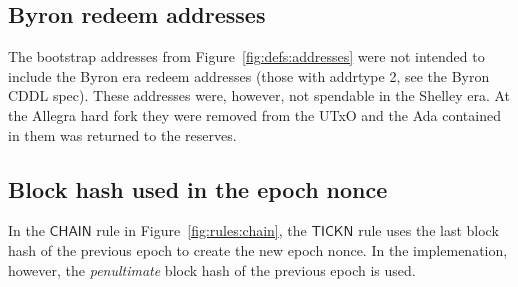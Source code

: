 \subsection{Byron redeem addresses}
\label{sec:errata:byron-redeem-addresses}

The bootstrap addresses from Figure~\ref{fig:defs:addresses} were not intended
to include the Byron era redeem addresses
(those with addrtype 2, see the Byron CDDL spec).
These addresses were, however, not spendable in the Shelley era.
At the Allegra hard fork they were removed from the UTxO
and the Ada contained in them was returned to the reserves.

\subsection{Block hash used in the epoch nonce}
\label{sec:block-hash-in-epoch-nonce}

In the $\mathsf{CHAIN}$ rule in Figure~\ref{fig:rules:chain}, the $\mathsf{TICKN}$ rule uses
the last block hash of the previous epoch to create the new epoch nonce.
In the implemenation, however, the \textit{penultimate} block hash of the previous epoch is used.
